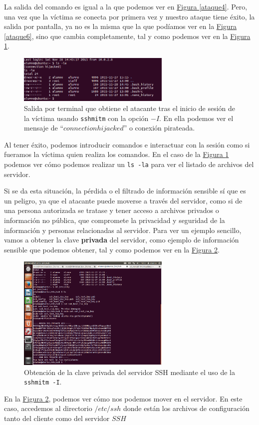\documentclass[10pt,a4paper,spanish]{article}
\begin{document}
La salida del comando es igual a la que podemos ver en \hyperref[ataque4]{Figura \ref*{ataque4}}. Pero, una vez que la víctima se conecta por primera vez y nuestro ataque tiene éxito, la salida por pantalla, ya no es la misma que la que podíamos ver en la \hyperref[ataque6]{Figura \ref*{ataque6}}, sino que cambia completamente, tal y como podemos ver en la \hyperref[ataque7]{Figura \ref*{ataque7}}.

\begin{figure}[!h]
        \centering
        \includegraphics[width=0.65\textwidth]{ataque7}
        \caption{Salida por terminal que obtiene el atacante tras el inicio de sesión de la víctima usando \texttt{sshmitm} con la opción $-I$. En ella podemos ver el mensaje de ``$connection hijacked$'' o conexión pirateada.}
        \label{ataque7}
\end{figure}

Al tener éxito, podemos introducir comandos e interactuar con la sesión como si fueramos la víctima quien realiza los comandos. En el caso de la \hyperref[ataque7]{Figura \ref*{ataque7}} podemos ver cómo podemos realizar un \texttt{ls -la} para ver el listado de archivos del servidor.

Si se da esta situación, la pérdida o el filtrado de información sensible sí que es un peligro, ya que el atacante puede moverse a través del servidor, como si de una persona autorizada se tratase y tener acceso a archivos privados o información no pública, que compromete la privacidad y seguridad de la información y personas relacionadas al servidor. Para ver un ejemplo sencillo, vamos a obtener la clave \textbf{privada} del servidor, como ejemplo de información sensible que podemos obtener, tal y como podemos ver en la \hyperref[ataque8]{Figura \ref*{ataque8}}.

\begin{figure}[H]
        \centering
        \includegraphics[width=0.65\textwidth]{ataque8}
        \caption{Obtención de la clave privada del servidor SSH mediante el uso de la \texttt{sshmitm -I}.}
        \label{ataque8}
\end{figure}

En la \hyperref[ataque8]{Figura \ref*{ataque8}}, podemos ver cómo nos podemos mover en el servidor. En este caso, accedemos al directorio $/etc/ssh$ donde están los archivos de configuración tanto del cliente como del servidor $SSH$

 

\end{document}
